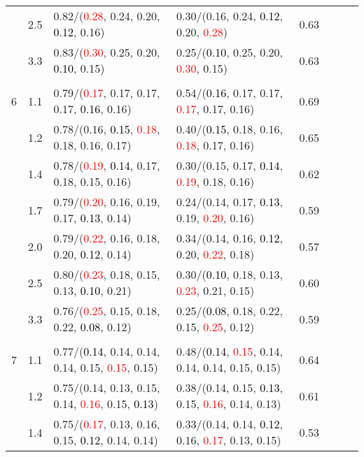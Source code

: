\documentclass[10pt,a4paper]{report}
\begin{document}
\begin{table}[!htbp]
\begin{center}
{\begin{tabular}{ccllcccc}
			&2.5&0.82/(\textcolor{red}{0.28}, 0.24, 0.20, \textcolor{black}{0.12}, 0.16)&0.30/(0.16, 0.24, \textcolor{black}{0.12}, 0.20, \textcolor{red}{0.28})&0.63\\
			&3.3&0.83/(\textcolor{red}{0.30}, 0.25, 0.20, \textcolor{black}{0.10}, 0.15)&0.25/(\textcolor{black}{0.10}, 0.25, 0.20, \textcolor{red}{0.30}, 0.15)&0.63\\
			&&&&\\
			6			&1.1&0.79/(\textcolor{red}{0.17}, 0.17, 0.17, 0.17, \textcolor{black}{0.16}, 0.16)&0.54/(\textcolor{black}{0.16}, 0.17, 0.17, \textcolor{red}{0.17}, 0.17, 0.16)&0.69\\
			&1.2&0.78/(0.16, \textcolor{black}{0.15}, \textcolor{red}{0.18}, 0.18, 0.16, 0.17)&0.40/(\textcolor{black}{0.15}, 0.18, 0.16, \textcolor{red}{0.18}, 0.17, 0.16)&0.65\\
			&1.4&0.78/(\textcolor{red}{0.19}, \textcolor{black}{0.14}, 0.17, 0.18, 0.15, 0.16)&0.30/(0.15, 0.17, \textcolor{black}{0.14}, \textcolor{red}{0.19}, 0.18, 0.16)&0.62\\
			&1.7&0.79/(\textcolor{red}{0.20}, 0.16, 0.19, 0.17, \textcolor{black}{0.13}, 0.14)&0.24/(0.14, 0.17, \textcolor{black}{0.13}, 0.19, \textcolor{red}{0.20}, 0.16)&0.59\\
			&2.0&0.79/(\textcolor{red}{0.22}, 0.16, 0.18, 0.20, \textcolor{black}{0.12}, 0.14)&0.34/(0.14, 0.16, \textcolor{black}{0.12}, 0.20, \textcolor{red}{0.22}, 0.18)&0.57\\
			&2.5&0.80/(\textcolor{red}{0.23}, 0.18, 0.15, 0.13, \textcolor{black}{0.10}, 0.21)&0.30/(\textcolor{black}{0.10}, 0.18, 0.13, \textcolor{red}{0.23}, 0.21, 0.15)&0.60\\
			&3.3&0.76/(\textcolor{red}{0.25}, 0.15, 0.18, 0.22, \textcolor{black}{0.08}, 0.12)&0.25/(\textcolor{black}{0.08}, 0.18, 0.22, 0.15, \textcolor{red}{0.25}, 0.12)&0.59\\
			&&&&\\
			7			&1.1&0.77/(\textcolor{black}{0.14}, 0.14, 0.14, 0.14, 0.15, \textcolor{red}{0.15}, 0.15)&0.48/(\textcolor{black}{0.14}, \textcolor{red}{0.15}, 0.14, 0.14, 0.14, 0.15, 0.15)&0.64\\
			&1.2&0.75/(0.14, 0.13, 0.15, 0.14, \textcolor{red}{0.16}, 0.15, \textcolor{black}{0.13})&0.38/(0.14, 0.15, \textcolor{black}{0.13}, 0.15, \textcolor{red}{0.16}, 0.14, 0.13)&0.61\\
			&1.4&0.75/(\textcolor{red}{0.17}, 0.13, 0.16, 0.15, \textcolor{black}{0.12}, 0.14, 0.14)&0.33/(0.14, 0.14, \textcolor{black}{0.12}, 0.16, \textcolor{red}{0.17}, 0.13, 0.15)&0.53\\

\end{tabular}}
\end{center}
\end{table}
\end{document}
